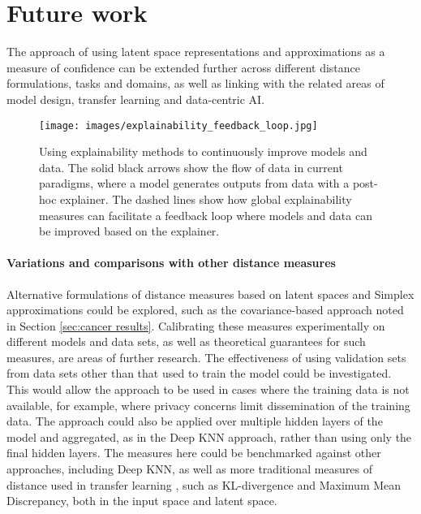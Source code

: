 \documentclass{article}
\begin{document}
\section{Future work}
\label{sec:future work}

The approach of using latent space representations and approximations as a measure of confidence can be extended further across different distance formulations, tasks and domains, as well as linking with the related areas of model design, transfer learning and data-centric AI.

\begin{figure}[ht]
  \centering
  \texttt{[image: images/explainability\_feedback\_loop.jpg]}
  \caption{Using explainability methods to continuously improve models and data. The solid black arrows show the flow of data in current paradigms, where a model generates outputs from data with a post-hoc explainer. The dashed lines show how global explainability measures can facilitate a feedback loop where models and data can be improved based on the explainer.}
  \label{explainability_loop}
\end{figure}


\paragraph{Variations and comparisons with other distance measures}
Alternative formulations of distance measures based on latent spaces and Simplex approximations could be explored, such as the covariance-based approach noted in Section \ref{sec:cancer results}.
Calibrating these measures experimentally on different models and data sets, as well as theoretical guarantees for such measures, are areas of further research.
The effectiveness of using validation sets from data sets other than that used to train the model could be investigated. This would allow the approach to be used in cases where the training data is not available, for example, where privacy concerns limit dissemination of the training data.
The approach could also be applied over multiple hidden layers of the model and aggregated, as in the Deep KNN approach, rather than using only the final hidden layers. The measures here could be benchmarked against other approaches, including Deep KNN, as well as more traditional measures of distance used in transfer learning \cite{zhuang_comprehensive_2021}, such as KL-divergence and Maximum Mean Discrepancy, both in the input space and latent space.
\end{document}
